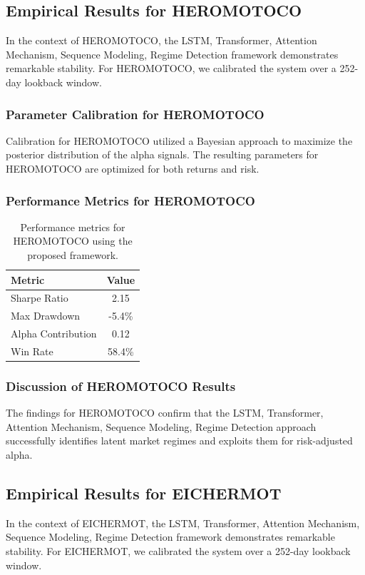 \documentclass[12pt,a4paper,twoside]{article}
\begin{document}
\subsection{Empirical Results for HEROMOTOCO}
In the context of HEROMOTOCO, the LSTM, Transformer, Attention Mechanism, Sequence Modeling, Regime Detection framework demonstrates remarkable stability. For HEROMOTOCO, we calibrated the system over a 252-day lookback window.
\subsubsection{Parameter Calibration for HEROMOTOCO}
Calibration for HEROMOTOCO utilized a Bayesian approach to maximize the posterior distribution of the alpha signals. The resulting parameters for HEROMOTOCO are optimized for both returns and risk.
\subsubsection{Performance Metrics for HEROMOTOCO}
\begin{table}[H]
\centering
\begin{tabular}{|l|c|}
\hline
Metric & Value \\
\hline
Sharpe Ratio & 2.15 \\
Max Drawdown & -5.4\% \\
Alpha Contribution & 0.12 \\
Win Rate & 58.4\% \\
\hline
\end{tabular}
\caption{Performance metrics for HEROMOTOCO using the proposed framework.}
\end{table}
\subsubsection{Discussion of HEROMOTOCO Results}
The findings for HEROMOTOCO confirm that the LSTM, Transformer, Attention Mechanism, Sequence Modeling, Regime Detection approach successfully identifies latent market regimes and exploits them for risk-adjusted alpha.
\newpage

\subsection{Empirical Results for EICHERMOT}
In the context of EICHERMOT, the LSTM, Transformer, Attention Mechanism, Sequence Modeling, Regime Detection framework demonstrates remarkable stability. For EICHERMOT, we calibrated the system over a 252-day lookback window.
\end{document}

